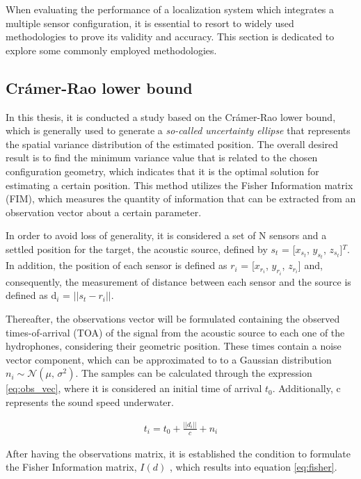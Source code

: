 When evaluating the performance of a localization system which integrates a multiple sensor configuration, it is essential to resort to widely used methodologies to prove its validity and accuracy. This section is dedicated to explore some commonly employed methodologies.

\subsection{Crámer-Rao lower bound}	\label{sec:cramer}

In this thesis, it is conducted a study based on the Crámer-Rao lower bound, which is generally used to generate a \textit{so-called uncertainty ellipse} \cite{bishop-cramer-rao} that represents the spatial variance distribution of the estimated position. The overall desired result is to find the minimum variance value that is related to the chosen configuration geometry, which indicates that it is the optimal solution for estimating a certain position. This method utilizes the Fisher Information matrix (FIM), which measures the quantity of information that can be extracted from an observation vector about a certain parameter.

In order to avoid loss of generality, it is considered a set of N sensors and a settled position for the target, the acoustic source, defined by $s_{t}$ = [$x_{s_{t}}$, $y_{s_{t}}$, $z_{s_{t}}$]$^T$. In addition, the position of each sensor is defined as $r_{i}$ = [$x_{r_{i}}$, $y_{r_{i}}$, $z_{r_{i}}$] and, consequently, the measurement of distance between each sensor and the source is defined as d$_{i}$ = $|| s_{t} - r_{i} ||$.

Thereafter, the observations vector will be formulated containing the observed times-of-arrival (TOA) of the signal from the acoustic source to each one of the hydrophones, considering their geometric position. These times contain a noise vector component, which can be approximated to to a Gaussian distribution $n_i \sim \mathcal{N}(\mu,\,\sigma^{2})$. The samples can be calculated through the expression \ref{eq:obs_vec}, where it is considered an initial time of arrival $t_0$. Additionally, c represents the sound speed underwater.

\begin{eqnarray}
	t_i = t_0 + \frac{||d_i||}{c} + n_i
	\label{eq:obs_vec}
\end{eqnarray}

After having the observations matrix, it is established the condition to formulate the Fisher Information matrix, $I(d)$ , which results into equation \ref{eq:fisher}.

